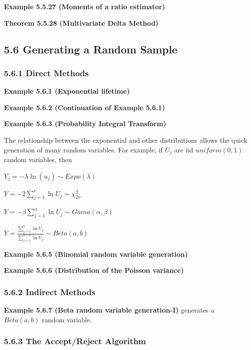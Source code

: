 \documentclass[10pt,twocolumn,portrait]{article}
\begin{document}
\textbf{Example 5.5.27 (Moments of a ratio estimator)}

\textbf{Theorem 5.5.28 (Multivariate Delta Method)}

\hypertarget{generating-a-random-sample}{%
\subsection{5.6 Generating a Random
Sample}\label{generating-a-random-sample}}

\hypertarget{lifetime}{%
\subsubsection{5.6.1 Direct Methods}\label{lifetime}}

\textbf{Example 5.6.1 (Exponential lifetime)}

\textbf{Example 5.6.2 (Continuation of Example 5.6.1)}

\textbf{Example 5.6.3 (Probability Integral Transform)}

The relationship between the exponential and other distributions allows
the quick generation of many random variables. For example, if \(U_j\)
are iid \(uniform(0,1)\) random variables, then

\(Y_j=-\lambda\ln(u_j)\sim Expo(\lambda)\)

\(Y=-2\sum_{j=1}^\nu\ln U_j\sim \chi^2_{2\nu}\)

\(Y=-\beta\sum_{j=1}^\alpha\ln U_j\sim Gama(\alpha,\beta)\)

\(Y=\frac{\sum_{j=1}^a\ln U_j}{\sum_{j=1}^{a+b}\ln U_j}\sim Beta(a,b)\)

\textbf{Example 5.6.5 (Binomial random variable generation)}

\textbf{Example 5.6.6 (Distribution of the Poisson variance)}

\hypertarget{indirect-methods}{%
\subsubsection{5.6.2 Indirect Methods}\label{indirect-methods}}

\textbf{Example 5.6.7 (Beta random variable generation-I)} generates a
\(Beta(a,b)\) random variable.

\hypertarget{the-acceptreject-algorithm}{%
\subsubsection{5.6.3 The Accept/Reject
Algorithm}\label{the-acceptreject-algorithm}}
\end{document}
